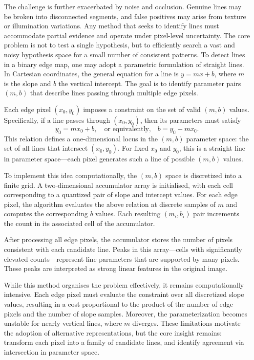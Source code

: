 The challenge is further exacerbated by noise and occlusion. Genuine lines may be broken into disconnected segments, and false positives may arise from texture or illumination variations. Any method that seeks to identify lines must accommodate partial evidence and operate under pixel-level uncertainty. The core problem is not to test a single hypothesis, but to efficiently search a vast and noisy hypothesis space for a small number of consistent patterns.
To detect lines in a binary edge map, one may adopt a parametric formulation of straight lines. In Cartesian coordinates, the general equation for a line is $y = mx + b$, where $m$ is the slope and $b$ the vertical intercept. The goal is to identify parameter pairs $(m, b)$ that describe lines passing through multiple edge pixels.

Each edge pixel $(x_0, y_0)$ imposes a constraint on the set of valid $(m, b)$ values. Specifically, if a line passes through $(x_0, y_0)$, then its parameters must satisfy
\[
y_0 = m x_0 + b,
\quad \text{or equivalently,} \quad
b = y_0 - m x_0.
\]
This relation defines a one-dimensional locus in the $(m, b)$ parameter space: the set of all lines that intersect $(x_0, y_0)$. For fixed $x_0$ and $y_0$, this is a straight line in parameter space—each pixel generates such a line of possible $(m, b)$ values.

To implement this idea computationally, the $(m, b)$ space is discretized into a finite grid. A two-dimensional accumulator array is initialised, with each cell corresponding to a quantized pair of slope and intercept values. For each edge pixel, the algorithm evaluates the above relation at discrete samples of $m$ and computes the corresponding $b$ values. Each resulting $(m_i, b_i)$ pair increments the count in its associated cell of the accumulator.

After processing all edge pixels, the accumulator stores the number of pixels consistent with each candidate line. Peaks in this array—cells with significantly elevated counts—represent line parameters that are supported by many pixels. These peaks are interpreted as strong linear features in the original image.

While this method organises the problem effectively, it remains computationally intensive. Each edge pixel must evaluate the constraint over all discretized slope values, resulting in a cost proportional to the product of the number of edge pixels and the number of slope samples. Moreover, the parameterization becomes unstable for nearly vertical lines, where $m$ diverges. These limitations motivate the adoption of alternative representations, but the core insight remains: transform each pixel into a family of candidate lines, and identify agreement via intersection in parameter space.

